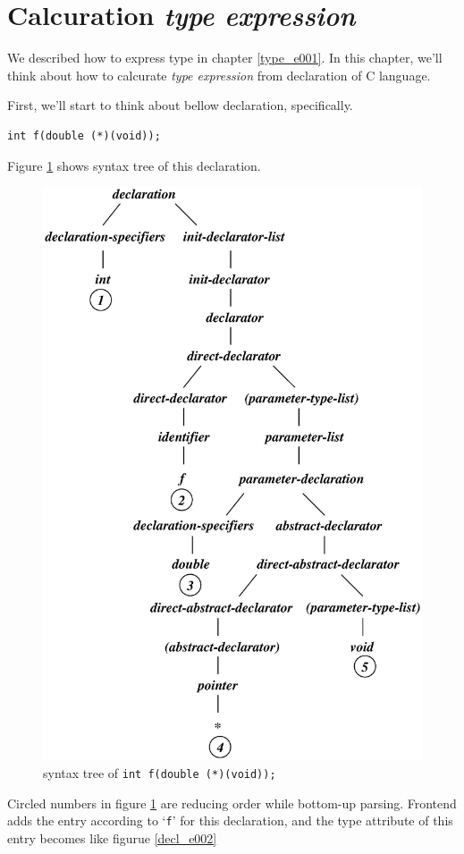 \section{Calcuration {\em type expression}}
We described how to express type in chapter \ref{type_e001}.
In this chapter, we'll think about how to calcurate
{\em type expression} from declaration of C language.

First, we'll start to think about bellow declaration, specifically.
\begin{verbatim}
int f(double (*)(void));
\end{verbatim}
Figure \ref{decl_e001} shows syntax tree of this declaration.
\begin{figure}[htbp]
\begin{center}
\includegraphics[width=1.0125\linewidth,height=1.4175\linewidth]{decl001.eps}
\caption{syntax tree of {\tt{int f(double (*)(void));}}}
\label{decl_e001}
\end{center}
\end{figure}
Circled numbers in figure \ref{decl_e001} are reducing order
while bottom-up parsing. Frontend adds the entry according to `{\tt{f}}'
for this declaration, and the type attribute of this entry becomes
like figurue \ref{decl_e002}

